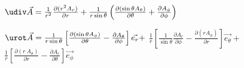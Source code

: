 
  \squishlist
   \item $\udiv \vec A = \frac{1}{r^2} \frac{\partial (r^2 A_r)}{\partial r}
          + \frac{1}{r\sin{\theta}}\left( \frac{\partial(\sin{\theta} A_\theta)}{\partial \theta}
          + \frac{\partial A_\phi}{\partial \phi} \right)$
   \item $\urot \vec A = \frac{1}{r\sin{\theta}}\left[ \frac{\partial(\sin{\theta} A_\phi)}{\partial \theta} - \frac{\partial A_\theta}{\partial \phi}\right]\vec{e_r} + $ $
      \frac{1}{r}\left[ \frac{1}{\sin{\theta}} \frac{\partial A_r}{\partial \phi} - \frac{\partial (r A_\phi)}{\partial r}\right]\vec{e_\theta} + $ $
      \frac{1}{r}\left[ \frac{\partial (r \ A_\theta)}{\partial r} - \frac{\partial A_r}{\partial \theta}\right]\vec{e_\phi}$
  \squishend